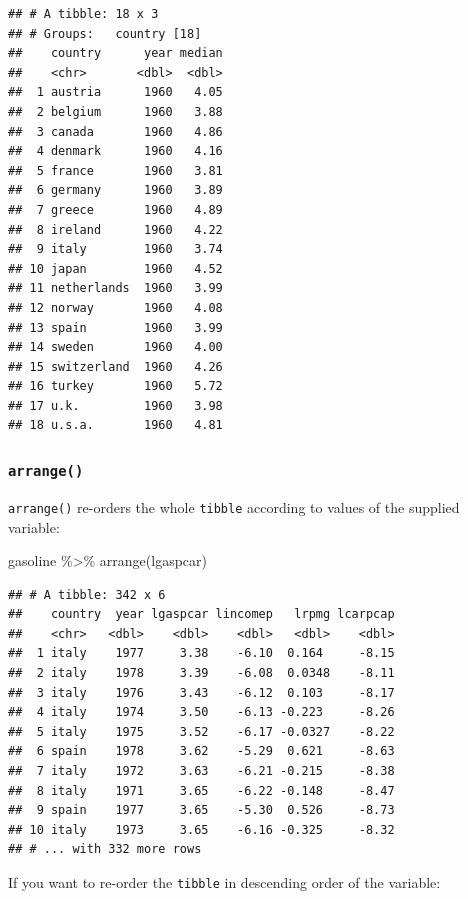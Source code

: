 \documentclass[
]{article}
\newenvironment{Shaded}{\begin{snugshade}}{\end{snugshade}}
\newcommand{\FunctionTok}[1]{\textcolor[rgb]{0.00,0.00,0.00}{#1}}
\newcommand{\NormalTok}[1]{#1}
\newcommand{\SpecialCharTok}[1]{\textcolor[rgb]{0.00,0.00,0.00}{#1}}
\begin{document}
\begin{verbatim}
## # A tibble: 18 x 3
## # Groups:   country [18]
##    country      year median
##    <chr>       <dbl>  <dbl>
##  1 austria      1960   4.05
##  2 belgium      1960   3.88
##  3 canada       1960   4.86
##  4 denmark      1960   4.16
##  5 france       1960   3.81
##  6 germany      1960   3.89
##  7 greece       1960   4.89
##  8 ireland      1960   4.22
##  9 italy        1960   3.74
## 10 japan        1960   4.52
## 11 netherlands  1960   3.99
## 12 norway       1960   4.08
## 13 spain        1960   3.99
## 14 sweden       1960   4.00
## 15 switzerland  1960   4.26
## 16 turkey       1960   5.72
## 17 u.k.         1960   3.98
## 18 u.s.a.       1960   4.81
\end{verbatim}

\hypertarget{arrange}{%
\subsubsection{\texorpdfstring{\texttt{arrange()}}{arrange()}}\label{arrange}}

\texttt{arrange()} re-orders the whole \texttt{tibble} according to values of the supplied variable:

\begin{Shaded}
\begin{Highlighting}[]
\NormalTok{gasoline }\SpecialCharTok{\%\textgreater{}\%}
  \FunctionTok{arrange}\NormalTok{(lgaspcar)}
\end{Highlighting}
\end{Shaded}

\begin{verbatim}
## # A tibble: 342 x 6
##    country  year lgaspcar lincomep   lrpmg lcarpcap
##    <chr>   <dbl>    <dbl>    <dbl>   <dbl>    <dbl>
##  1 italy    1977     3.38    -6.10  0.164     -8.15
##  2 italy    1978     3.39    -6.08  0.0348    -8.11
##  3 italy    1976     3.43    -6.12  0.103     -8.17
##  4 italy    1974     3.50    -6.13 -0.223     -8.26
##  5 italy    1975     3.52    -6.17 -0.0327    -8.22
##  6 spain    1978     3.62    -5.29  0.621     -8.63
##  7 italy    1972     3.63    -6.21 -0.215     -8.38
##  8 italy    1971     3.65    -6.22 -0.148     -8.47
##  9 spain    1977     3.65    -5.30  0.526     -8.73
## 10 italy    1973     3.65    -6.16 -0.325     -8.32
## # ... with 332 more rows
\end{verbatim}

If you want to re-order the \texttt{tibble} in descending order of the variable:
\end{document}
